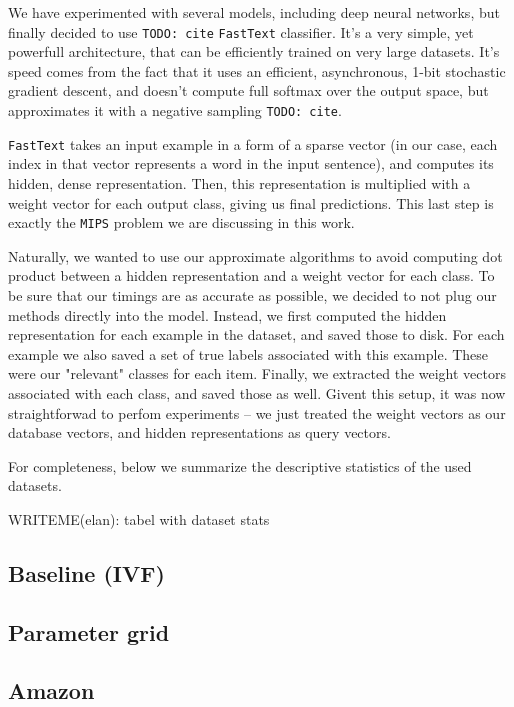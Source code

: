         We have experimented with several models, including deep neural networks, but finally decided to use
        \texttt{TODO: cite} \texttt{FastText} classifier. It's a very simple, yet powerfull architecture, that
        can be efficiently trained on very large datasets. It's speed comes from the fact that it uses an efficient,
        asynchronous, 1-bit stochastic gradient descent, and doesn't compute full softmax over the output space,
        but approximates it with a negative sampling \texttt{TODO: cite}.

        \texttt{FastText} takes an input example in a form of a sparse vector (in our case, each index in that vector
        represents a word in the input sentence), and computes its hidden, dense representation. Then, this
        representation is multiplied with a weight vector for each output class, giving us final predictions.
        This last step is exactly the \texttt{MIPS} problem we are discussing in this work.

        Naturally, we wanted to use our approximate algorithms to avoid computing dot product between a hidden
        representation and a weight vector for each class. To be sure that our timings are as accurate as possible,
        we decided to not plug our methods directly into the model. Instead, we first computed the hidden representation
        for each example in the dataset, and saved those to disk. For each example we also saved a set of
        true labels associated with this example. These were our "relevant" classes for each item.
        Finally, we extracted the weight vectors associated with each class, and saved those as well. Givent this setup,
        it was now straightforwad to perfom experiments -- we just treated the weight vectors as our database vectors,
        and hidden representations as query vectors.

        For completeness, below we summarize the descriptive statistics of the used datasets.

        WRITEME(elan): tabel with dataset stats


    \subsection{Baseline (IVF)}


    \subsection{Parameter grid}


    \subsection{Amazon}

